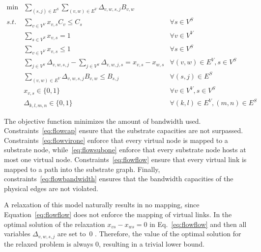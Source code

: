 \documentclass{llncs}
\begin{document}

\begin{align}
    \min & \sum\limits_{(s,j) \in E^{S}} \sum\limits_{(v,w) \in E^{V}} \Delta_{v,w,s,j} B_{v,w} \nonumber \\
    s.t. & \sum\limits_{v \in V^{V}} x_{v,s} C_{v} \leq C_{s}                     & \forall s \in V^{S}  \label{eq:flowcap} \\
    & \sum\limits_{s \in V^{S}} x_{v,s} = 1                                  & \forall v \in V^{V}  \label{eq:flowvirone}\\
         & \sum\limits_{v \in V^{V}} x_{v,s} \leq 1                               & \forall s \in V^{S} \label{eq:flowsubone}\\
         & \sum\limits_{j \in V^{S}} \Delta_{v,w,s,j} - \sum\limits_{j \in V^{S}} \Delta_{v,w,j,s} = x_{v,s} - x_{w,s}  & \forall (v,w) \in E^{V}, s \in V^{S}\label{eq:flowflow} \\
         & \sum\limits_{(v,w) \in E^{V}} \Delta_{v,w,s,j} B_{v,w} \leq B_{s,j}  & \forall (s,j) \in E^{S} \label{eq:flowbandwidth} \\
         & x_{v,s} \in \{0,1\} & \forall v \in V^{V}, s \in V^{S} \\
         & \Delta_{k,l,m,n} \in \{0,1\} & \forall (k,l) \in E^{V}, (m,n) \in E^{S}
\end{align} 

The objective function minimizes the amount of bandwidth used. 
Constraints~\eqref{eq:flowcap} ensure that the substrate capacities are not surpassed. 
Constraints~\eqref{eq:flowvirone} enforce that every virtual node is mapped to a substrate node, while~\eqref{eq:flowsubone} enforce that every substrate node hosts at most one virtual node. 
Constraints~\eqref{eq:flowflow}
ensure that every virtual link is mapped to a path into the substrate graph. Finally, constraints~\eqref{eq:flowbandwidth} ensures that the bandwidth capacities of the physical edges are not violated.

A relaxation of this model naturally results in no mapping, since Equation~\eqref{eq:flowflow} does not enforce the mapping of virtual links. 
In the optimal solution of the relaxation $x_{vs}-x_{ws}=0$ in Eq.~\ref{eq:flowflow}  and then
all variables $\Delta_{v,w,s,j}$ are set to~$0$ . 
Therefore, the value of the optimal solution for the relaxed problem is always $0$, resulting in a trivial lower bound.
\end{document}
